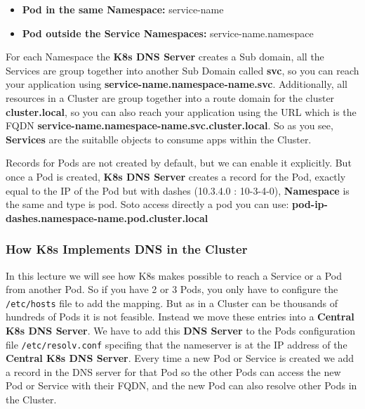\documentclass{article}
\begin{document}
\begin{itemize}
    \item \textbf{Pod in the same Namespace:} service-name
    \item \textbf{Pod outside the Service Namespaces:} service-name.namespace
\end{itemize}

For each Namespace the \textbf{K8s DNS Server} creates a Sub domain, all the Services are group together into another Sub Domain called \textbf{svc}, so you can reach your application using \textbf{service-name.namespace-name.svc}. Additionally, all resources in a Cluster are group together into a route domain for the cluster \textbf{cluster.local}, so you can also reach your application using the URL which is the FQDN \textbf{service-name.namespace-name.svc.cluster.local}. So as you see, \textbf{Services} are the suitablle objects to consume apps within the Cluster.

Records for Pods are not created by default, but we can enable it explicitly. But once a Pod is created, \textbf{K8s DNS Server} creates a record for the Pod, exactly equal to the IP of the Pod but with dashes (10.3.4.0 : 10-3-4-0), \textbf{Namespace} is the same and type is pod. Soto access directly a pod you can use: \textbf{pod-ip-dashes.namespace-name.pod.cluster.local}

\subsubsection{How K8s Implements DNS in the Cluster}

In this lecture we will see how K8s makes possible to reach a Service or a Pod from another Pod. So if you have 2 or 3 Pods, you only have to configure the \verb|/etc/hosts| file to add the mapping. But as in a Cluster can be thousands of hundreds of Pods it is not feasible. Instead we move these entries into a \textbf{Central K8s DNS Server}. We have to add this \textbf{DNS Server} to the Pods configuration file \verb|/etc/resolv.conf| specifing that the nameserver is at the IP address of the \textbf{Central K8s DNS Server}. Every time a new Pod or Service is created we add a record in the DNS server for that Pod so the other Pods can access the new Pod or Service with their FQDN, and the new Pod can also resolve other Pods in the Cluster.
\end{document}

